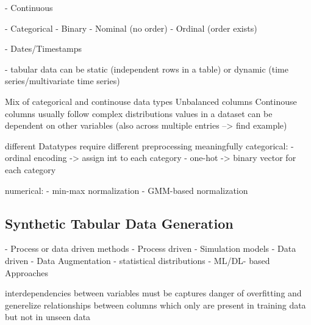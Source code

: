 
- Continuous \cite{lederrey2022DATGANIntegratingExperta
}

- Categorical 
    - Binary
    - Nominal (no order)
    - Ordinal (order exists)
\cite{lederrey2022DATGANIntegratingExperta
}

- Dates/Timestamps \cite{hernandez2022SyntheticDataGeneration}

- tabular data can be static (independent rows in a table) or dynamic (time series/multivariate time series) \cite{padhi2021TabularTransformersModeling}



Mix of categorical and continouse data types \cite{li2021ImprovingGANInverse}
Unbalanced columns \cite{li2021ImprovingGANInverse}
Continouse columns usually follow complex distributions \cite{li2021ImprovingGANInverse}
values in a dataset can be dependent on other variables \cite{lederrey2022DATGANIntegratingExperta} (also across multiple entries --> find example)

different Datatypes require different preprocessing \cite{fan2020RelationalDataSynthesisa} meaningfully \cite{lederrey2022DATGANIntegratingExperta}
categorical:
- ordinal encoding -> assign int to each category
- one-hot -> binary vector for each category

numerical:
- min-max normalization
- GMM-based normalization



\subsection{Synthetic Tabular Data Generation}

- Process or data driven methods \cite{goncalves2020GenerationEvaluationSynthetic}
    - Process driven
        - Simulation models \cite{kowalczyk2022TaxonomyUseSynthetic}
    - Data driven
        - Data Augmentation \cite{kowalczyk2022TaxonomyUseSynthetic}
        - statistical distributions \cite{kowalczyk2022TaxonomyUseSynthetic}
        - ML/DL- based Approaches \cite{kowalczyk2022TaxonomyUseSynthetic}

interdependencies between variables must be captures \cite{lederrey2022DATGANIntegratingExperta}
danger of overfitting and generelize relationships between columns which only are present in training data but not in unseen data \cite{lederrey2022DATGANIntegratingExperta}



